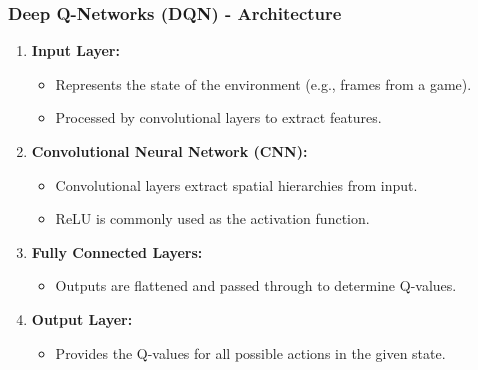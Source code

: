 \documentclass[aspectratio=169]{beamer}
\begin{document}
\begin{frame}[fragile]
    \frametitle{Deep Q-Networks (DQN) - Architecture}
    
    \begin{enumerate}
        \item \textbf{Input Layer:}
        \begin{itemize}
            \item Represents the state of the environment (e.g., frames from a game).
            \item Processed by convolutional layers to extract features.
        \end{itemize}
        
        \item \textbf{Convolutional Neural Network (CNN):}
        \begin{itemize}
            \item Convolutional layers extract spatial hierarchies from input.
            \item ReLU is commonly used as the activation function.
        \end{itemize}
        
        \item \textbf{Fully Connected Layers:}
        \begin{itemize}
            \item Outputs are flattened and passed through to determine Q-values.
        \end{itemize}
        
        \item \textbf{Output Layer:}
        \begin{itemize}
            \item Provides the Q-values for all possible actions in the given state.
        \end{itemize}
    \end{enumerate}
\end{frame}
\end{document}
